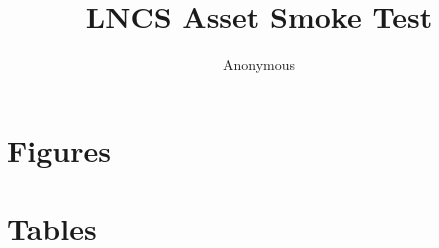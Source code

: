 \documentclass[runningheads]{../overleaf/llncs}
\title{LNCS Asset Smoke Test}
\author{Anonymous}
\institute{Artifact layout check only}
\begin{document}
\maketitle

\section{Figures}


\clearpage
\section{Tables}

\end{document}
